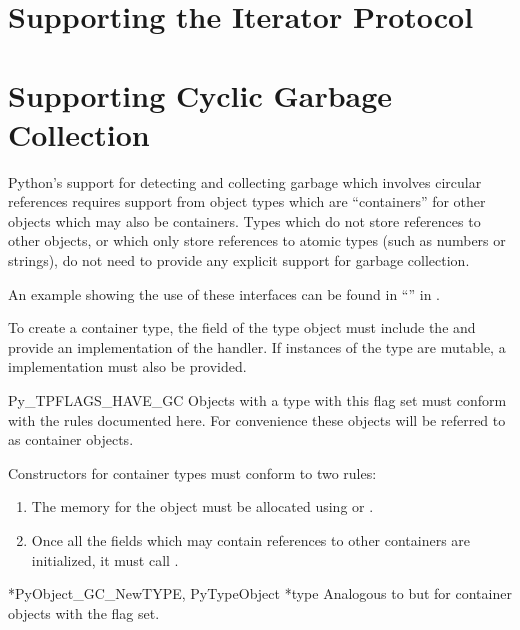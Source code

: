 \section{Supporting the Iterator Protocol
         \label{supporting-iteration}}


\section{Supporting Cyclic Garbage Collection
         \label{supporting-cycle-detection}}

Python's support for detecting and collecting garbage which involves
circular references requires support from object types which are
``containers'' for other objects which may also be containers.  Types
which do not store references to other objects, or which only store
references to atomic types (such as numbers or strings), do not need
to provide any explicit support for garbage collection.

An example showing the use of these interfaces can be found in
``'' in
.

To create a container type, the  field of the type
object must include the  and provide an
implementation of the  handler.  If instances of the
type are mutable, a  implementation must also be
provided.

\begin{datadesc}{Py_TPFLAGS_HAVE_GC}
  Objects with a type with this flag set must conform with the rules
  documented here.  For convenience these objects will be referred to
  as container objects.
\end{datadesc}

Constructors for container types must conform to two rules:

\begin{enumerate}
\item  The memory for the object must be allocated using
        or .

\item  Once all the fields which may contain references to other
       containers are initialized, it must call
       .
\end{enumerate}

\begin{cfuncdesc}{*}{PyObject_GC_New}{TYPE, PyTypeObject *type}
  Analogous to  but for container objects with
  the  flag set.
\end{cfuncdesc}

